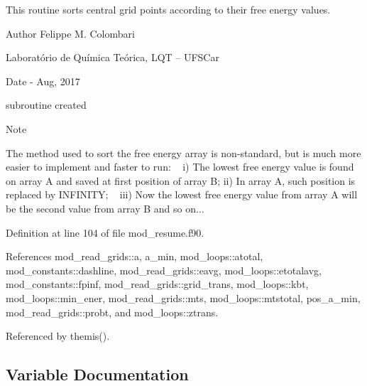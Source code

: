 This routine sorts central grid points according to their free energy values. 

\begin{DoxyAuthor}{Author}
Felippe M. Colombari
\begin{DoxyItemize}
\item Laboratório de Química Teórica, L\+QT -- U\+F\+S\+Car 
\end{DoxyItemize}
\end{DoxyAuthor}
\begin{DoxyDate}{Date}
-\/ Aug, 2017
\begin{DoxyItemize}
\item subroutine created 
\end{DoxyItemize}
\end{DoxyDate}
\begin{DoxyNote}{Note}
~\newline

\begin{DoxyItemize}
\item The method used to sort the free energy array is non-\/standard, but is much more easier to implement and faster to run\+: ~\newline
 i) The lowest free energy value is found on array A and saved at first position of array B; ii) In array A, such position is replaced by I\+N\+F\+I\+N\+I\+TY; ~\newline
 iii) Now the lowest free energy value from array A will be the second value from array B and so on... 
\end{DoxyItemize}
\end{DoxyNote}


Definition at line 104 of file mod\+\_\+resume.\+f90.



References mod\+\_\+read\+\_\+grids\+::a, a\+\_\+min, mod\+\_\+loops\+::atotal, mod\+\_\+constants\+::dashline, mod\+\_\+read\+\_\+grids\+::eavg, mod\+\_\+loops\+::etotalavg, mod\+\_\+constants\+::fpinf, mod\+\_\+read\+\_\+grids\+::grid\+\_\+trans, mod\+\_\+loops\+::kbt, mod\+\_\+loops\+::min\+\_\+ener, mod\+\_\+read\+\_\+grids\+::mts, mod\+\_\+loops\+::mtstotal, pos\+\_\+a\+\_\+min, mod\+\_\+read\+\_\+grids\+::probt, and mod\+\_\+loops\+::ztrans.



Referenced by themis().



\subsection{Variable Documentation}
